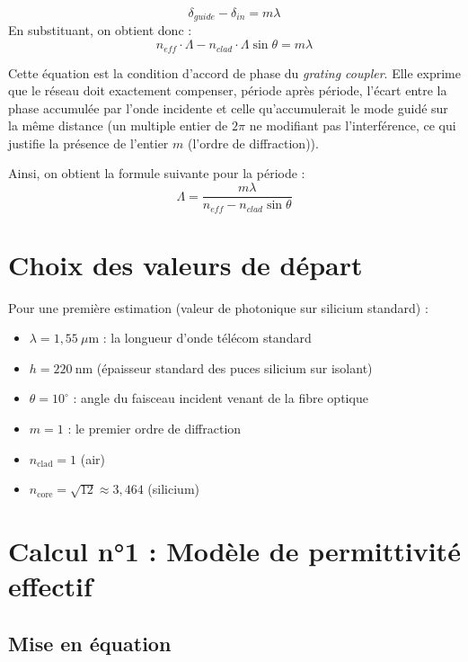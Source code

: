 \documentclass[a4paper,11pt]{report}
\begin{document}
\begin{equation}
\delta_{guide} - \delta_{in} = m\lambda
\label{eq:diff_marche}
\end{equation}
En substituant, on obtient donc :
\begin{equation}
n_{eff}\cdot\Lambda - n_{clad}\cdot\Lambda\sin\theta = m\lambda
\label{eq:accord_phase}
\end{equation}

Cette équation est la condition d'accord de phase du \textit{grating coupler}. Elle exprime que le réseau doit exactement compenser, période après période, l'écart entre la phase accumulée par l'onde incidente et celle qu'accumulerait le mode guidé sur la même distance (un multiple entier de $2\pi$ ne modifiant pas l'interférence, ce qui justifie la présence de l'entier $m$ (l'ordre de diffraction)).

Ainsi, on obtient la formule suivante pour la période :
\begin{equation}
\boxed{\Lambda = \frac{m\lambda}{n_{eff} - n_{clad}\sin\theta}}
\label{eq:lambda_theorique}
\end{equation}

\section{Choix des valeurs de départ}
Pour une première estimation (valeur de photonique sur silicium standard) :
\begin{itemize}
    \item $\lambda = 1{,}55~\mu\text{m}$ : la longueur d'onde télécom standard 
    \item $h = 220 ~\text{nm}$ (épaisseur standard des puces silicium sur isolant)
    \item $\theta = 10^\circ$ : angle du faisceau incident venant de la fibre optique
    \item $m = 1$ : le premier ordre de diffraction
    \item $n_{\text{clad}} = 1$ (air)
    \item $n_{\text{core}} = \sqrt{12} \approx 3{,}464$ (silicium)

\end{itemize}

\section{Calcul n°1 : Modèle de permittivité effectif}
\label{sec:calcul_neff}

\subsection*{Mise en équation}
\end{document}
